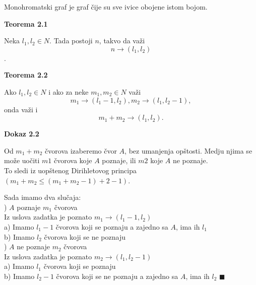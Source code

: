 \documentclass[12pt,a4paper]{article}
\begin{document}
	\noindent	Monohromatski graf je graf čije su sve ivice obojene istom bojom.	
	\vspace{1.5em}

	{\noindent\fontsize{12pt}{12pt}\textbf{Teorema 2.1}}
	\vspace{0.5em}

	\noindent	Neka $l_{1}, l_{2} \in N$. Tada postoji $n$, takvo da važi
	\[n \rightarrow (l_{1}, l_{2})\].
	\vspace{1.5em}\

	{\noindent\fontsize{12pt}{12pt}\textbf{Teorema 2.2}}
	\vspace{0.5em}

	\noindent	Ako $l_{1}, l_{2} \in N$ i ako za neke $m_{1}, m_{2} \in N$ važi	
	\[m_{1} \rightarrow (l_{1}-1, l_{2}), m_{2} \rightarrow (l_{1}, l_{2}-1) ,\]
	onda važi i
	\[m_{1} + m_{2} \rightarrow (l_{1}, l_{2}).\]
	\vspace{1.5em}

	{\noindent\fontsize{12pt}{12pt}\textbf{Dokaz 2.2}}
	\vspace{0.5em}

	\noindent	Od $m_{1}+m_{2}$ čvorova izaberemo čvor $A$, bez umanjenja opštosti. 
	Medju njima se može uočiti $m1$ čvorova koje $A$ poznaje, ili $m2$ koje $A$ ne poznaje.\\
	To sledi iz uopštenog Dirihletovog principa $(m_{1}+m_{2} \leq (m_{1}+m_{2}-1)+2-1)$.

	\vspace{0.5em}
	\noindent Sada imamo dva slučaja:\\


	) $A$ poznaje $m_{1}$ čvorova\\
	
	Iz uslova zadatka je poznato $m_{1} \rightarrow (l_{1}-1, l_{2})$\\
	\indent a) Imamo $l_{1}-1$ čvorova koji se poznaju a zajedno sa $A$, ima ih $l_{1}$\\
	\indent b) Imamo $l_{2}$ čvorova koji se ne poznaju\\

	\vspace{0.5em}
	) $A$ ne poznaje $m_{2}$ čvorova\\
	
	Iz uslova zadatka je poznato $m_{2} \rightarrow (l_{1}, l_{2}-1)$\\
	\indent a) Imamo $l_{1}$ čvorova koji se poznaju\\
	\indent b) Imamo $l_{2}-1$ čvorova koji se ne poznaju a zajedno sa $A$, ima ih $l_{2}$ \hspace{0.5em}$\blacksquare$\\
	
\end{document}
